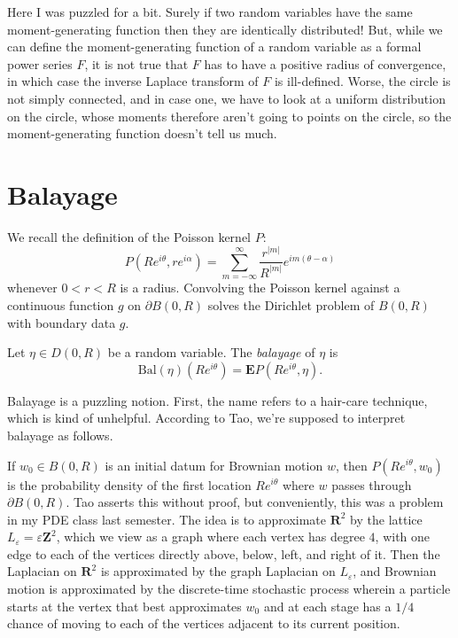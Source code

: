 \documentclass[12pt]{article}
\begin{document}
Here I was puzzled for a bit. Surely if two random variables have the same moment-generating function then they are identically distributed!
But, while we can define the moment-generating function of a random variable as a formal power series $F$, it is not true that $F$ has to have a positive radius of convergence, in which case the inverse Laplace transform of $F$ is ill-defined.
Worse, the circle is not simply connected, and in case one, we have to look at a uniform distribution on the circle, whose moments therefore aren't going to points on the circle, so the moment-generating function doesn't tell us much.

\section{Balayage}
We recall the definition of the Poisson kernel $P$:
$$P(Re^{i\theta}, re^{i\alpha}) = \sum_{m = -\infty}^\infty \frac{r^{|m|}}{R^{|m|}} e^{im(\theta - \alpha)}$$
whenever $0 < r < R$ is a radius.
Convolving the Poisson kernel against a continuous function $g$ on $\partial B(0, R)$ solves the Dirichlet problem of $B(0, R)$ with boundary data $g$.

\begin{definition}
Let $\eta \in D(0, R)$ be a random variable. The \emph{balayage} of $\eta$ is
$$\text{Bal}(\eta)(Re^{i\theta}) = \mathbf EP(Re^{i\theta}, \eta).$$
\end{definition}

Balayage is a puzzling notion. First, the name refers to a hair-care technique, which is kind of unhelpful.
According to Tao, we're supposed to interpret balayage as follows.

If $w_0 \in B(0, R)$ is an initial datum for Brownian motion $w$, then $P(Re^{i\theta}, w_0)$ is the probability density of the first location $Re^{i\theta}$ where $w$ passes through $\partial B(0, R)$.
Tao asserts this without proof, but conveniently, this was a problem in my PDE class last semester.
The idea is to approximate $\mathbf R^2$ by the lattice $L_\varepsilon = \varepsilon \mathbf Z^2$, which we view as a graph where each vertex has degree $4$, with one edge to each of the vertices directly above, below, left, and right of it.
Then the Laplacian on $\mathbf R^2$ is approximated by the graph Laplacian on $L_\varepsilon$, and Brownian motion is approximated by the discrete-time stochastic process wherein a particle starts at the vertex that best approximates $w_0$ and at each stage has a $1/4$ chance of moving to each of the vertices adjacent to its current position.
\end{document}
